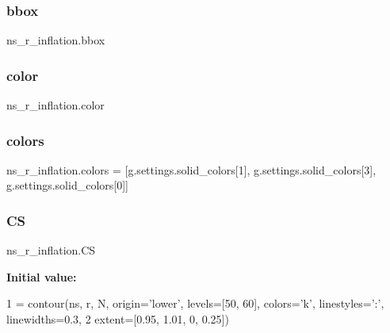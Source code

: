 \subsubsection{\texorpdfstring{bbox}{bbox}}
{\footnotesize\ttfamily ns\+\_\+r\+\_\+inflation.\+bbox}

\mbox{\label{namespacens__r__inflation_a9be64afa662ebbd4e8714391c1a1b0a6}} 
\subsubsection{\texorpdfstring{color}{color}}
{\footnotesize\ttfamily ns\+\_\+r\+\_\+inflation.\+color}

\mbox{\label{namespacens__r__inflation_ac74469ab7814df3a78d0605b500a54df}} 
\subsubsection{\texorpdfstring{colors}{colors}}
{\footnotesize\ttfamily ns\+\_\+r\+\_\+inflation.\+colors = \mbox{[}g.\+settings.\+solid\+\_\+colors\mbox{[}1\mbox{]}, g.\+settings.\+solid\+\_\+colors\mbox{[}3\mbox{]}, g.\+settings.\+solid\+\_\+colors\mbox{[}0\mbox{]}\mbox{]}}

\mbox{\label{namespacens__r__inflation_ac626acca6862f0bf73236153114929c2}} 
\subsubsection{\texorpdfstring{CS}{CS}}
{\footnotesize\ttfamily ns\+\_\+r\+\_\+inflation.\+CS}

{\bfseries Initial value\+:}
\begin{DoxyCode}
1 =  contour(ns, r, N, origin=\textcolor{stringliteral}{'lower'}, levels=[50, 60], colors=\textcolor{stringliteral}{'k'}, linestyles=\textcolor{stringliteral}{':'}, linewidths=0.3,
2                  extent=[0.95, 1.01, 0, 0.25])
\end{DoxyCode}
\mbox{\label{namespacens__r__inflation_aab0559174abeb9f1fba469fcf5b7ca7e}} 
